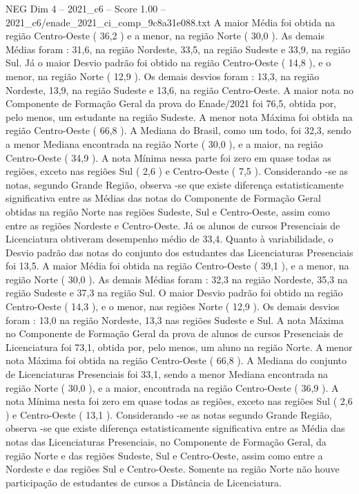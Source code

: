 \begin{textsample}{NEG Dim 4 – 2021\_c6 – Score 1.00 – 2021\_c6/enade\_2021\_ci\_comp\_9c8a31e088.txt}
A maior Média foi obtida na região Centro-Oeste ( 36,2 ) e a menor, na região Norte ( 30,0 ).
As demais Médias foram : 31,6, na região Nordeste, 33,5, na região Sudeste e 33,9, na região Sul.
Já o maior Desvio padrão foi obtido na região Centro-Oeste ( 14,8 ), e o menor, na região Norte ( 12,9 ).
Os demais desvios foram : 13,3, na região Nordeste, 13,9, na região Sudeste e 13,6, na região Centro-Oeste.
A maior nota no Componente de Formação Geral da prova do Enade/2021 foi 76,5, obtida por, pelo menos, um estudante na região Sudeste.
A menor nota Máxima foi obtida na região Centro-Oeste ( 66,8 ).
A Mediana do Brasil, como um todo, foi 32,3, sendo a menor Mediana encontrada na região Norte ( 30,0 ), e a maior, na região Centro-Oeste ( 34,9 ).
A nota Mínima nessa parte foi zero em quase todas as regiões, exceto nas regiões Sul ( 2,6 ) e Centro-Oeste ( 7,5 ).
Considerando -se as notas, segundo Grande Região, observa -se que existe diferença estatisticamente significativa entre as Médias das notas do Componente de Formação Geral obtidas na região Norte nas regiões Sudeste, Sul e Centro-Oeste, assim como entre as regiões Nordeste e Centro-Oeste.
Já os alunos de cursos Presenciais de Licenciatura obtiveram desempenho médio de 33,4.
Quanto à variabilidade, o Desvio padrão das notas do conjunto dos estudantes das Licenciaturas Presenciais foi 13,5.
A maior Média foi obtida na região Centro-Oeste ( 39,1 ), e a menor, na região Norte ( 30,0 ).
As demais Médias foram : 32,3 na região Nordeste, 35,3 na região Sudeste e 37,3 na região Sul.
O maior Desvio padrão foi obtido na região Centro-Oeste ( 14,3 ), e o menor, nas regiões Norte ( 12,9 ).
Os demais desvios foram : 13,0 na região Nordeste, 13,3 nas regiões Sudeste e Sul.
A nota Máxima no Componente de Formação Geral da prova de alunos de cursos Presenciais de Licenciatura foi 73,1, obtida por, pelo menos, um aluno na região Norte.
A menor nota Máxima foi obtida na região Centro-Oeste ( 66,8 ).
A Mediana do conjunto de Licenciaturas Presenciais foi 33,1, sendo a menor Mediana encontrada na região Norte ( 30,0 ), e a maior, encontrada na região Centro-Oeste ( 36,9 ).
A nota Mínima nesta foi zero em quase todas as regiões, exceto nas regiões Sul ( 2,6 ) e Centro-Oeste ( 13,1 ).
Considerando -se as notas segundo Grande Região, observa -se que existe diferença estatisticamente significativa entre as Média das notas das Licenciaturas Presenciais, no Componente de Formação Geral, da região Norte e das regiões Sudeste, Sul e Centro-Oeste, assim como entre a Nordeste e das regiões Sul e Centro-Oeste.
Somente na região Norte não houve participação de estudantes de cursos a Distância de Licenciatura.

\end{textsample}

